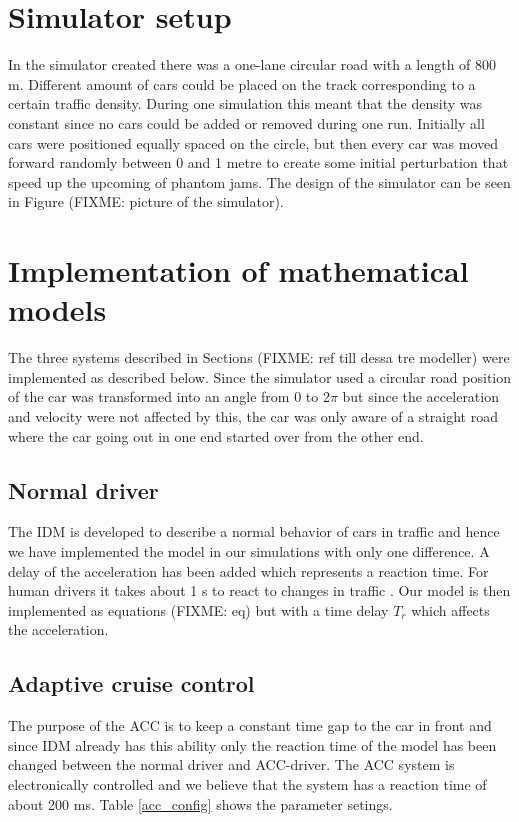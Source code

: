 \section{Simulator setup}
In the simulator created there was a one-lane circular road with a length of 800 m. Different amount of cars could be placed on the track corresponding to a certain traffic density. During one simulation this meant that the density was constant since no cars could be added or removed during one run. Initially all cars were positioned equally spaced on the circle, but then every car was moved forward randomly between 0 and 1 metre to create some initial perturbation that speed up the upcoming of phantom jams. The design of the simulator can be seen in Figure (FIXME: picture of the simulator).

\section{Implementation of mathematical models}
The three systems described in Sections (FIXME: ref till dessa tre modeller) were implemented as described below. Since the simulator used a circular road position of the car was transformed into an angle from 0 to 2\begin{math}\pi \end{math} but since the acceleration and velocity were not affected by this, the car was only aware of a straight road where the car going out in one end started over from the other end.

\subsection {Normal driver}
The IDM is developed to describe a normal behavior of cars in traffic and hence we have implemented the model in our simulations with only one difference. A delay of the acceleration has been added which represents a reaction time. For human drivers it takes about 1 s to react to changes in traffic \cite{idm}. Our model is then implemented as equations (FIXME: eq) but with a time delay \begin{math}T_r\end{math} which affects the acceleration.

\subsection {Adaptive cruise control }
The purpose of the ACC is to keep a constant time gap to the car in front and since IDM already has this ability only the reaction time of the model has been changed between the normal driver and ACC-driver. The ACC system is electronically controlled and we believe that the system has a reaction time of about 200 ms. Table \ref{acc_config} shows the parameter setings.

